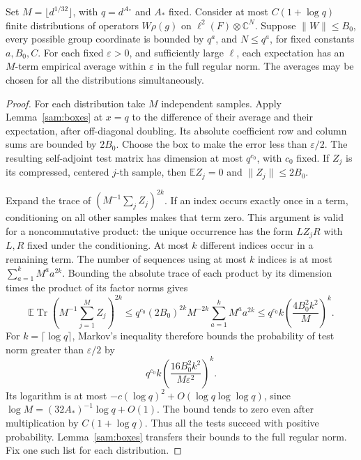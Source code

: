 \begin{lemma}\label{sam:empirical}
Set \(M=\lfloor d^{1/32}\rfloor\), with \(q=d^{A_*}\) and \(A_*\)
fixed.  Consider at most \(C(1+\log q)\) finite distributions of
operators \(W\rho(g)\) on \(\ell^2(F)\otimes\mathbb C^N\).
Suppose \(\|W\|\le B_0\), every possible group coordinate is
bounded by \(q^a\), and \(N\le q^a\), for fixed constants
\(a,B_0,C\).  For each fixed \(\varepsilon>0\), and sufficiently
large \(\ell\), each expectation has an \(M\)-term empirical
average within \(\varepsilon\) in the full regular norm.  The
averages may be chosen for all the distributions simultaneously.
\end{lemma}

\begin{proof}
For each distribution take \(M\) independent samples.  Apply
Lemma~\ref{sam:boxes} at \(x=q\) to the difference of their average
and their expectation, after off-diagonal doubling.  Its absolute
coefficient row and column sums are bounded by \(2B_0\).  Choose the
box to make the error less than \(\varepsilon/2\).  The resulting
self-adjoint test matrix has dimension at most \(q^{c_0}\), with
\(c_0\) fixed.  If \(Z_j\) is its compressed, centered \(j\)-th
sample, then \(\mathbb E Z_j=0\) and \(\|Z_j\|\le2B_0\).

Expand the trace of \((M^{-1}\sum_j Z_j)^{2k}\).  If an index occurs
exactly once in a term, conditioning on all other samples makes that
term zero.  This argument is valid for a noncommutative product: the
unique occurrence has the form \(LZ_jR\) with \(L,R\) fixed under
the conditioning.  At most \(k\) different indices occur in a
remaining term.  The number of sequences using at most \(k\)
indices is at most
\(\sum_{a=1}^k M^a a^{2k}\).  Bounding the absolute trace of each
product by its dimension times the product of its factor norms gives
\[
 \mathbb E\operatorname{Tr}
 \left(M^{-1}\sum_{j=1}^M Z_j\right)^{2k}
 \le q^{c_0}(2B_0)^{2k}M^{-2k}
       \sum_{a=1}^k M^a a^{2k}
 \le q^{c_0}k\left(\frac{4B_0^2k^2}{M}\right)^k.
\]
For \(k=\lceil\log q\rceil\), Markov's inequality therefore bounds
the probability of test norm greater than \(\varepsilon/2\) by
\[
 q^{c_0}k\left(\frac{16B_0^2k^2}{M\varepsilon^2}\right)^k.
\]
Its logarithm is at most
\(-c(\log q)^2+O(\log q\log\log q)\), since
\(\log M=(32A_*)^{-1}\log q+O(1)\).  The bound tends to zero even
after multiplication by \(C(1+\log q)\).  Thus all the tests succeed
with positive probability.  Lemma~\ref{sam:boxes} transfers their
bounds to the full regular norm.  Fix one such list for each
distribution.
\end{proof}


